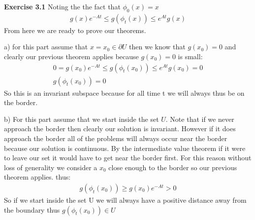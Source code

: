 \documentclass[12pt]{article}
\newenvironment{exercise}[1]{\vspace{.1in}\noindent\textbf{Exercise #1 \hspace{.05em}}}{}
\theoremstyle{definition}
\theoremstyle{remark}
\begin{document}
\begin{exercise}{3.1}
	Noting the the fact that $\phi_0(x)=x$
	\begin{align}
		g(x)e^{-At}\leq g(\phi_t(x)) \leq e^{At}g(x)
	\end{align}
	From here we are ready to prove our theorems.


	a) for this part assume that $x=x_0\in \partial U$ then we know that $g(x_0)=0$ and clearly our previous theorem applies because $g(x_0)=0$ is small:
	\begin{align}
		0=g(x_0)e^{-At}\leq g(\phi_t(x_0))\leq e^{At}g(x_0)=0 \\
		g(\phi_t(x_0))=0
	\end{align}
	So this is an invariant subspace because for all time t  we will always thus be on the border.

	b) For this part assume that we start inside the set $U$. Note that if we never approach the border then clearly our solution is invariant. However if it does approach the border all of the problems will always occur near the border because our solution is continuous. By the intermediate value theorem if it were to leave our set it would have to get near the border first. For this reason without loss of generality we consider a $x_0$ close enough to the border so our previous theorem applies. thus:
	\begin{align}
		g(\phi_t(x_0))\geq g(x_0)e^{-At}>0
	\end{align}
	So if we start inside the set U we will always have a positive distance away from the boundary thus $g(\phi_t(x_0))\in U$


\end{exercise}
\end{document}
